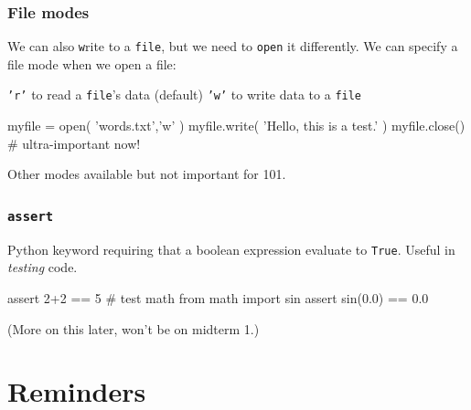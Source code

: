 \documentclass[11pt]{beamer}
\begin{document}
\begin{frame}[fragile]
  \frametitle{File modes}
  \Enlarge

  \begin{itemize}
  \myitem  We can also \texttt{w}rite to a \texttt{file}, but we need to \texttt{open} it differently. %
  \myitem  We can specify a file mode when we open a file:
    \begin{itemize}
    \mysubitem  \texttt{'r'} to read a \texttt{file}'s data (default)
    \mysubitem  \texttt{'w'} to write data to a \texttt{file}
    \end{itemize}
  \end{itemize} %
  \begin{semiverbatim}
myfile = open( 'words.txt','w' )
myfile.write( 'Hello, this is a test.' )
myfile.close()  # ultra-important now!
  \end{semiverbatim}
  \begin{itemize}
  \myitem  Other modes available but not important for 101.
  \end{itemize}
\end{frame}

\begin{frame}[fragile]
  \frametitle{\texttt{assert}}
  \Enlarge

  \begin{itemize}
  \myitem  Python keyword requiring that a boolean expression evaluate to \texttt{True}. %
  \myitem  Useful in \emph{testing} code.
  \end{itemize}
  \begin{semiverbatim}
assert 2+2 == 5  # test math %
from math import sin
assert sin(0.0) == 0.0 %
  \end{semiverbatim}
  \begin{itemize}
  \myitem  (More on this later, won't be on midterm 1.)
  \end{itemize}
\end{frame}

\section{Reminders}
\end{document}
